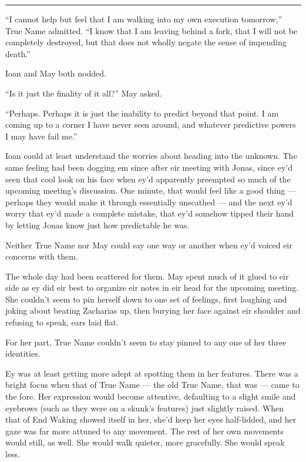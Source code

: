 \begin{center}\rule{0.5\linewidth}{0.5pt}\end{center}

``I cannot help but feel that I am walking into my own execution tomorrow,'' True Name admitted. ``I know that I am leaving behind a fork, that I will not be completely destroyed, but that does not wholly negate the sense of impending death.''

Ioan and May both nodded.

``Is it just the finality of it all?'' May asked.

``Perhaps. Perhaps it is just the inability to predict beyond that point. I am coming up to a corner I have never seen around, and whatever predictive powers I may have fail me.''

Ioan could at least understand the worries about heading into the unknown. The same feeling had been dogging em since after eir meeting with Jonas, since ey'd seen that cool look on his face when ey'd apparently preempted so much of the upcoming meeting's discussion. One minute, that would feel like a good thing — perhaps they would make it through essentially unscathed — and the next ey'd worry that ey'd made a complete mistake, that ey'd somehow tipped their hand by letting Jonas know just how predictable he was.

Neither True Name nor May could say one way or another when ey'd voiced eir concerns with them.

The whole day had been scattered for them. May spent much of it glued to eir side as ey did eir best to organize eir notes in eir head for the upcoming meeting. She couldn't seem to pin herself down to one set of feelings, first laughing and joking about beating Zacharias up, then burying her face against eir shoulder and refusing to speak, ears laid flat.

For her part, True Name couldn't seem to stay pinned to any one of her three identities.

Ey was at least getting more adept at spotting them in her features. There was a bright focus when that of True Name — the old True Name, that was — came to the fore. Her expression would become attentive, defaulting to a slight smile and eyebrows (such as they were on a skunk's features) just slightly raised. When that of End Waking showed itself in her, she'd keep her eyes half-lidded, and her gaze was far more attuned to any movement. The rest of her own movements would still, as well. She would walk quieter, more gracefully. She would speak less.

